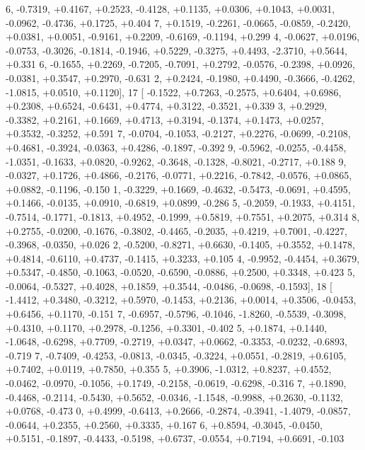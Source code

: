 \begin{DoxyCode}
      6, -0.7319, +0.4167, +0.2523, -0.4128, +0.1135, +0.0306, +0.1043, +0.0031, -0.0962, -0.4736, +0.1725, +0.404
      7, +0.1519, -0.2261, -0.0665, -0.0859, -0.2420, +0.0381, +0.0051, -0.9161, +0.2209, -0.6169, -0.1194, +0.299
      4, -0.0627, +0.0196, -0.0753, -0.3026, -0.1814, -0.1946, +0.5229, -0.3275, +0.4493, -2.3710, +0.5644, +0.331
      6, -0.1655, +0.2269, -0.7205, -0.7091, +0.2792, -0.0576, -0.2398, +0.0926, -0.0381, +0.3547, +0.2970, -0.631
      2, +0.2424, -0.1980, +0.4490, -0.3666, -0.4262, -1.0815, +0.0510, +0.1120],
17 [ -0.1522, +0.7263, -0.2575, +0.6404, +0.6986, +0.2308, +0.6524, -0.6431, +0.4774, +0.3122, -0.3521, +0.339
      3, +0.2929, -0.3382, +0.2161, +0.1669, +0.4713, +0.3194, -0.1374, +0.1473, +0.0257, +0.3532, -0.3252, +0.591
      7, -0.0704, -0.1053, -0.2127, +0.2276, -0.0699, -0.2108, +0.4681, -0.3924, -0.0363, +0.4286, -0.1897, -0.392
      9, -0.5962, -0.0255, -0.4458, -1.0351, -0.1633, +0.0820, -0.9262, -0.3648, -0.1328, -0.8021, -0.2717, +0.188
      9, -0.0327, +0.1726, +0.4866, -0.2176, -0.0771, +0.2216, -0.7842, -0.0576, +0.0865, +0.0882, -0.1196, -0.150
      1, -0.3229, +0.1669, -0.4632, -0.5473, -0.0691, +0.4595, +0.1466, -0.0135, +0.0910, -0.6819, +0.0899, -0.286
      5, -0.2059, -0.1933, +0.4151, -0.7514, -0.1771, -0.1813, +0.4952, -0.1999, +0.5819, +0.7551, +0.2075, +0.314
      8, +0.2755, -0.0200, -0.1676, -0.3802, -0.4465, -0.2035, +0.4219, +0.7001, -0.4227, -0.3968, -0.0350, +0.026
      2, -0.5200, -0.8271, +0.6630, -0.1405, +0.3552, +0.1478, +0.4814, -0.6110, +0.4737, -0.1415, +0.3233, +0.105
      4, -0.9952, -0.4454, +0.3679, +0.5347, -0.4850, -0.1063, -0.0520, -0.6590, -0.0886, +0.2500, +0.3348, +0.423
      5, -0.0064, -0.5327, +0.4028, +0.1859, +0.3544, -0.0486, -0.0698, -0.1593],
18 [ -1.4412, +0.3480, -0.3212, +0.5970, -0.1453, +0.2136, +0.0014, +0.3506, -0.0453, +0.6456, +0.1170, -0.151
      7, -0.6957, -0.5796, -0.1046, -1.8260, -0.5539, -0.3098, +0.4310, +0.1170, +0.2978, -0.1256, +0.3301, -0.402
      5, +0.1874, +0.1440, -1.0648, -0.6298, +0.7709, -0.2719, +0.0347, +0.0662, -0.3353, -0.0232, -0.6893, -0.719
      7, -0.7409, -0.4253, -0.0813, -0.0345, -0.3224, +0.0551, -0.2819, +0.6105, +0.7402, +0.0119, +0.7850, +0.355
      5, +0.3906, -1.0312, +0.8237, +0.4552, -0.0462, -0.0970, -0.1056, +0.1749, -0.2158, -0.0619, -0.6298, -0.316
      7, +0.1890, -0.4468, -0.2114, -0.5430, +0.5652, -0.0346, -1.1548, -0.9988, +0.2630, -0.1132, +0.0768, -0.473
      0, +0.4999, -0.6413, +0.2666, -0.2874, -0.3941, -1.4079, -0.0857, -0.0644, +0.2355, +0.2560, +0.3335, +0.167
      6, +0.8594, -0.3045, -0.0450, +0.5151, -0.1897, -0.4433, -0.5198, +0.6737, -0.0554, +0.7194, +0.6691, -0.103

\end{DoxyCode}
